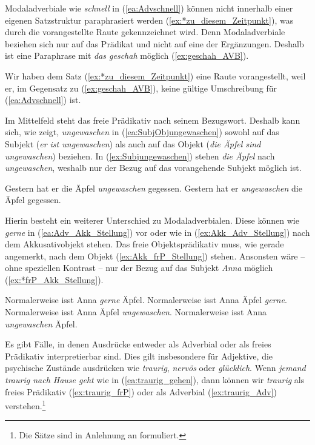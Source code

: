 Modaladverbiale wie \textit{schnell} in (\ref{ea:Advschnell}) können nicht innerhalb einer eigenen Satzstruktur paraphrasiert werden (\ref{ex:*zu_diesem_Zeitpunkt}), was durch die vorangestellte Raute gekennzeichnet wird. Denn Modaladverbiale beziehen sich nur auf das Prädikat und nicht auf eine der Ergänzungen. Deshalb ist eine Paraphrase mit \textit{das geschah} möglich (\ref{ex:geschah_AVB}).

\ea \label{ea:frPvsAdv}
\label{ea:Advschnell}
\label{ex:*zu_diesem_Zeitpunkt}
\label{ex:geschah_AVB}
\z 
\z 

Wir haben dem Satz (\ref{ex:*zu_diesem_Zeitpunkt}) eine Raute vorangestellt, weil er, im Gegensatz zu (\ref{ex:geschah_AVB}), keine gültige Umschreibung für (\ref{ea:Advschnell}) ist. 

Im Mittelfeld steht das freie Prädikativ nach seinem Bezugswort. Deshalb kann sich, wie \citet[266]{Mueller2008} zeigt, \textit{ungewaschen} in (\ref{ea:SubjObjungewaschen}) sowohl auf das Subjekt (\textit{er ist ungewaschen}) als auch auf das Objekt (\textit{die Äpfel sind ungewaschen}) beziehen. In (\ref{ex:Subjungewaschen}) stehen \textit{die Äpfel} nach \textit{ungewaschen}, weshalb nur der Bezug auf das vorangehende Subjekt möglich ist.   

\ea \label{ea:frPungewaschen}
\ea \label{ea:SubjObjungewaschen} Gestern hat er die Äpfel \textit{ungewaschen} gegessen.
\ex \label{ex:Subjungewaschen} Gestern hat er \textit{ungewaschen} die Äpfel gegessen.
\z 
\z 

Hierin besteht ein weiterer Unterschied zu Modaladverbialen. Diese können wie \textit{gerne} in (\ref{ea:Adv_Akk_Stellung}) vor oder wie in (\ref{ex:Akk_Adv_Stellung}) nach dem Akkusativobjekt stehen. Das freie Objektsprädikativ muss, wie gerade angemerkt, nach dem Objekt (\ref{ex:Akk_frP_Stellung}) stehen. Ansonsten wäre -- ohne speziellen Kontrast -- nur der Bezug auf das Subjekt \textit{Anna} möglich (\ref{ex:*frP_Akk_Stellung}).

\ea \label{ea:frP_Adv_Stellung}
\ea Normalerweise isst Anna \textit{gerne} Äpfel.\label{ea:Adv_Akk_Stellung}
\ex Normalerweise isst Anna Äpfel \textit{gerne}. \label{ex:Akk_Adv_Stellung}
\ex  Normalerweise isst Anna Äpfel \textit{ungewaschen}.\label{ex:Akk_frP_Stellung}
\ex Normalerweise isst Anna \textit{ungewaschen} Äpfel.\label{ex:*frP_Akk_Stellung} 
\z 
\z 

Es gibt Fälle, in denen Ausdrücke entweder als Adverbial oder als freies Prädikativ interpretierbar sind. Dies gilt insbesondere für Adjektive, die psychische Zustände ausdrücken wie \textit{traurig}, \textit{nervös} oder \textit{glücklich}. Wenn \textit{jemand traurig nach Hause geht} wie in (\ref{ea:traurig_gehen}), dann können wir \textit{traurig} als freies Prädikativ (\ref{ex:traurig_frP}) oder als Adverbial (\ref{ex:traurig_Adv}) verstehen.\footnote{Die Sätze sind in Anlehnung an \citet[77]{Schaefer13} formuliert.}  

